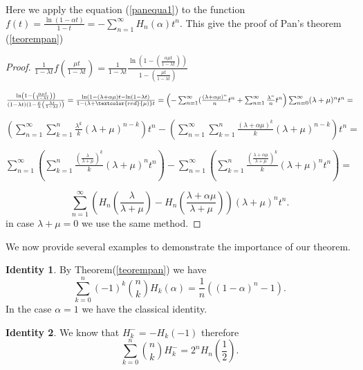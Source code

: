 \documentclass[a4paper,10pt,oneside]{article}
\newcommand{\col}[2]{ \textcolor{#1}{#2}}
\theoremstyle{definition}
\newtheorem{identity2}{Identity}[section]
\theoremstyle{remark}
\newcommand{\idi}[1]{\begin{identity2}{#1}\end{identity2}}
\begin{document}
Here we apply the equation (\ref{panequa1}) to the function $f(t)=\frac{\ln(1-\alpha t)}{1-t}=-\sum_{n=1}^{\infty}H_n(\alpha)t^n$. This give the proof of Pan's theorem (\ref{teorempan})
\begin{proof}
  $\frac{1}{1-\lambda t}f\left(\frac{\mu t}{1-\lambda t}\right)=\frac{1}{1-\lambda t}\frac{\ln\left(1- \left(\frac{\alpha\mu t}{1-\lambda t}\right)\right)}{1-\left(\frac{\mu t}{1-\lambda t}\right)}$\par
 $ \frac{\ln\left(1- \left(\frac{\alpha\mu t}{1-\lambda t}\right)\right)}{(1-\lambda t)(1-\frac{\mu}{\lambda}\left(\frac{\lambda t}{1-\lambda t})\right)}=\frac{\ln(1-(\lambda+\alpha\mu) t-\ln(1-\lambda t)}{1-(\lambda+\col{red}{\mu)}t}=
 \left(-\sum_{n=1}^{\infty}(\frac{(\lambda+\alpha\mu)^n}{n}t^n+\sum_{n=1}^{\infty}\frac{\lambda^n}{n}t^n\right)\sum_{n=0}^{\infty}(\lambda+\mu)^nt^n=$\par
 $\left(\sum_{n=1}^{\infty}\sum_{k=1}^n\frac{\lambda^k}{k}(\lambda+\mu)^{n-k}\right)t^n
 -\left(\sum_{n=1}^{\infty}\sum_{k=1}^n\frac{(\lambda+\alpha\mu)^k}{k}(\lambda+\mu)^{n-k}\right)t^n=$\par
 $ \sum_{n=1}^{\infty}\left(\sum_{k=1}^n\frac{(\frac{\lambda}{\lambda+\mu})^k}{k}(\lambda+\mu)^nt^n\right)- \sum_{n=1}^{\infty}\left(\sum_{k=1}^n\frac{(\frac{\lambda+\alpha\mu}{\lambda+\mu})^k}{k}(\lambda+\mu)^nt^n\right)=$\par
 $$ \sum_{n=1}^{\infty}\left(H_n(\frac{\lambda}{\lambda+\mu})-H_n(\frac{\lambda+\alpha\mu}{\lambda+\mu})\right)(\lambda+\mu)^nt^n. $$
in case $\lambda+\mu=0$ we use the same method.\par 

  \end{proof}
We now provide several examples to demonstrate the importance of our theorem.
\idi{
By Theorem(\ref{teorempan}) we have
$$\sum_{k=0}^n(-1)^k\binom{n}{k}H_{k}(\alpha)=\frac{1}{n}\left((1-\alpha)^{n}-1\right).\label{idi1}$$
In the case $\alpha =1$ we have the classical identity.}
\idi{We know that  $H_k^-=-H_k(-1)$  therefore
 $$\sum_{k=0}^n\binom{n}{k}H_k^-=2^nH_n(\frac{1}{2}).$$}
\end{document}
